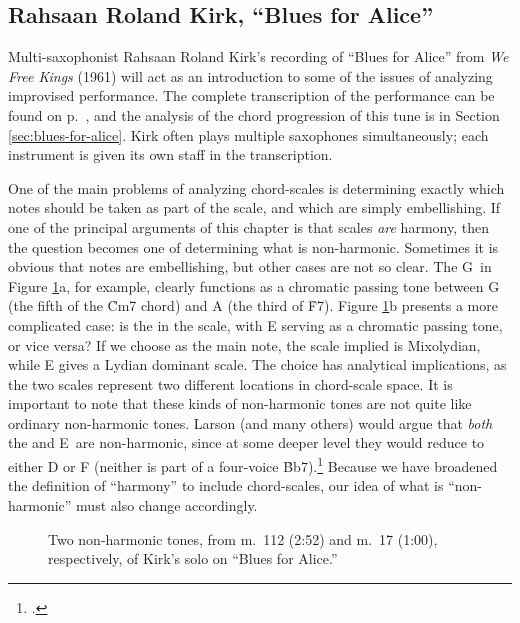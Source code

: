 \subsection{Rahsaan Roland Kirk, “Blues for Alice”}
\label{subsec:kirk-blues-for-alice}

Multi-saxophonist Rahsaan Roland Kirk's recording of ``Blues for Alice'' from
\emph{We Free Kings} (1961) will act as an introduction to some of the issues
of analyzing improvised performance. The complete transcription of the
performance can be found on p.~\pageref{transcription:blues-for-alice}, and
the analysis of the chord progression of this tune is in Section
\ref{sec:blues-for-alice}. Kirk often plays multiple saxophones
simultaneously; each instrument is given its own staff in the transcription.

One of the main problems of analyzing chord-scales is determining exactly
which notes should be taken as part of the scale, and which are simply
embellishing. If one of the principal arguments of this chapter is that scales
\emph{are} harmony, then the question becomes one of determining what is
non-harmonic. Sometimes it is obvious that notes are embellishing, but other
cases are not so clear. The G\sharp\ in Figure \ref{csa:non-harmonic-tones}a,
for example, clearly functions as a chromatic passing tone between G (the
fifth of the \h{Cm7} chord) and A (the third of \h{F7}). Figure
\ref{csa:non-harmonic-tones}b presents a more complicated case: is the \Eflat
in the scale, with E\nat{} serving as a chromatic passing tone, or vice versa?
If we choose \Eflat as the main note, the scale implied is \Bflat Mixolydian,
while E\nat{} gives a \Bflat Lydian dominant scale. The choice has analytical
implications, as the two scales represent two different locations in
chord-scale space. It is important to note that these kinds of non-harmonic
tones are not quite like ordinary non-harmonic tones. Larson (and many others)
would argue that \emph{both} the \Eflat and E\nat\ are non-harmonic, since at
some deeper level they would reduce to either D or F (neither is part of a four-voice
\h{Bb7}).\footcite[5--10]{larson:2009} Because we have broadened the
definition of ``harmony'' to include chord-scales, our idea of what is
``non-harmonic'' must also change accordingly.

\begin{figure}[tbp]
  \caption[Two non-harmonic tones in Kirk's solo.]{Two non-harmonic tones, from
    m.~112 (2:52) and m.~17 (1:00), respectively, of Kirk's solo on ``Blues for Alice.''}
  \label{csa:non-harmonic-tones}
\end{figure}

